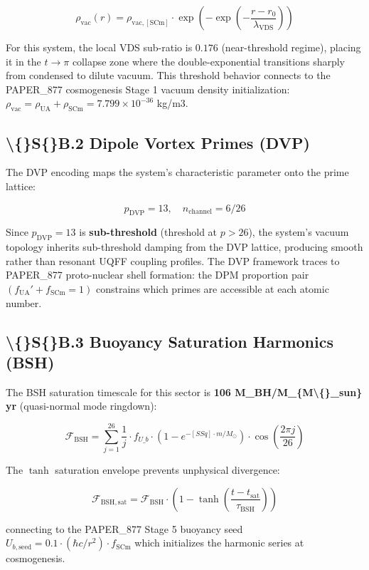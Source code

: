 \documentclass[11pt]{article}
\begin{document}
$$\rho_{\mathrm{vac}}(r) = \rho_{\mathrm{vac,[SCm]}} \cdot \exp\!\left(-\exp\!\left(-\frac{r - r_0}{\lambda_{\mathrm{VDS}}}\right)\right)$$

For this system, the local VDS sub-ratio is $0.176$ (near-threshold regime), placing it in the $t \to \pi$ collapse zone where the double-exponential transitions sharply from condensed to dilute vacuum. This threshold behavior connects to the PAPER\_877 cosmogenesis Stage 1 vacuum density initialization: $\rho_{\mathrm{vac}} = \rho_{\mathrm{UA}} + \rho_{\mathrm{SCm}} = 7.799 \times 10^{-36}$ kg/m3.

\subsection*{\textbackslash\{\}S\{\}B.2 Dipole Vortex Primes (DVP)}

The DVP encoding maps the system's characteristic parameter onto the prime lattice:

$$p_{\mathrm{DVP}} = 13, \quad n_{\mathrm{channel}} = 6/26$$

Since $p_{\mathrm{DVP}} = 13$ is \textbf{sub-threshold} (threshold at $p > 26$), the system's vacuum topology inherits sub-threshold damping from the DVP lattice, producing smooth rather than resonant UQFF coupling profiles. The DVP framework traces to PAPER\_877 proto-nuclear shell formation: the DPM proportion pair $(f_{\mathrm{UA}}' + f_{\mathrm{SCm}} = 1)$ constrains which primes are accessible at each atomic number.

\subsection*{\textbackslash\{\}S\{\}B.3 Buoyancy Saturation Harmonics (BSH)}

The BSH saturation timescale for this sector is \textbf{106 M\_BH/M\_\{M\textbackslash\{\}\_sun\} yr} (quasi-normal mode ringdown):

$$\mathcal{F}_{\mathrm{BSH}} = \sum_{j=1}^{26} \frac{1}{j} \cdot f_{U\_b} \cdot \left(1 - e^{-[SSq] \cdot m/M_\odot}\right) \cdot \cos\!\left(\frac{2\pi j}{26}\right)$$

The $\tanh$ saturation envelope prevents unphysical divergence:

$$\mathcal{F}_{\mathrm{BSH,sat}} = \mathcal{F}_{\mathrm{BSH}} \cdot \left(1 - \tanh\!\left(\frac{t - t_{\mathrm{sat}}}{\tau_{\mathrm{BSH}}}\right)\right)$$

connecting to the PAPER\_877 Stage 5 buoyancy seed $U_{b,\mathrm{seed}} = 0.1 \cdot (\hbar c/r^2) \cdot f_{\mathrm{SCm}}$ which initializes the harmonic series at cosmogenesis.
\end{document}
